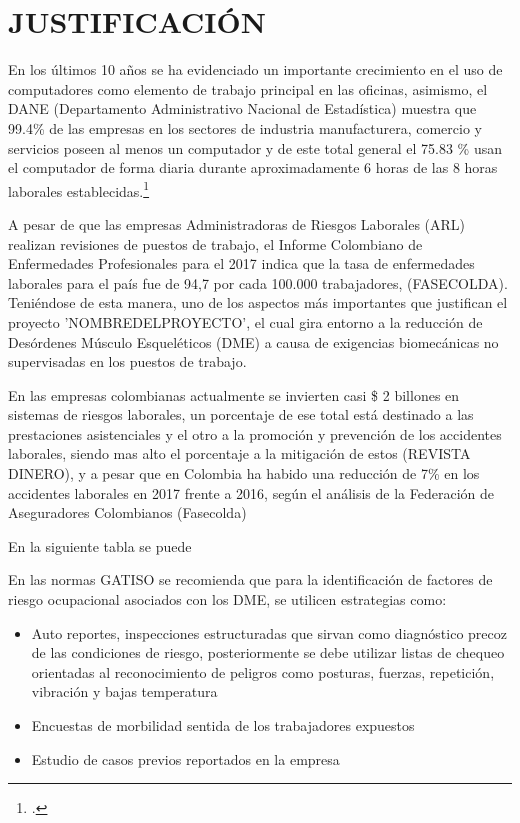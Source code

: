 \chapter{JUSTIFICACIÓN}
En los últimos 10 años se ha evidenciado un importante crecimiento en el uso de computadores como elemento de trabajo principal en las oficinas, asimismo, el DANE (Departamento Administrativo Nacional de Estadística)  muestra que 99.4\% de las empresas en los sectores de industria manufacturera, comercio y servicios poseen al menos un computador y de este total general el 75.83 \% usan el computador de forma diaria durante aproximadamente 6 horas de las 8 horas laborales establecidas.\footcite[]{Dane2013IndicadoresEmpresas}

A pesar de que las empresas Administradoras de Riesgos Laborales (ARL) realizan revisiones de puestos de trabajo, el Informe Colombiano de Enfermedades Profesionales para el 2017 indica que la tasa de enfermedades laborales para el país fue de 94,7 por cada 100.000 trabajadores, (FASECOLDA). Teniéndose de esta manera, uno de los aspectos más importantes que justifican el proyecto 'NOMBREDELPROYECTO', el cual gira entorno a la reducción de Desórdenes Músculo Esqueléticos (DME) a causa de exigencias biomecánicas no supervisadas en los puestos de trabajo.

En las empresas colombianas actualmente se invierten casi \$ 2 billones en sistemas de riesgos laborales, un porcentaje de ese total está destinado a las prestaciones asistenciales y el otro a la promoción y prevención de los accidentes laborales, siendo mas alto el porcentaje a la mitigación de estos  (REVISTA DINERO), y a pesar que en Colombia ha habido una reducción de 7\% en los accidentes laborales en 2017 frente a 2016, según el análisis de la Federación de Aseguradores Colombianos (Fasecolda)

En la siguiente tabla se puede 


En las normas GATISO se recomienda que para la identificación de factores de riesgo ocupacional asociados con los DME, se utilicen estrategias como:
\begin{itemize}
    \item Auto reportes, inspecciones estructuradas que sirvan como diagnóstico precoz de las condiciones de riesgo, posteriormente se debe utilizar listas de chequeo orientadas al reconocimiento de peligros como posturas, fuerzas, repetición, vibración y bajas temperatura
    \item Encuestas de morbilidad sentida de los trabajadores expuestos
    \item Estudio de casos previos reportados en la empresa
\end{itemize}

